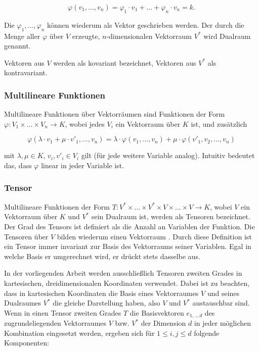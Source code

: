 \documentclass[a4paper,fontsize=12pt,toc=bib,parskip=half,ngerman]{scrartcl}
\begin{document}
\begin{equation}
	\varphi(v_1, ..., v_n) = \varphi_1 \cdot v_1 + ... + \varphi_n \cdot v_n = k.
\end{equation}

Die $\varphi_1, ..., \varphi_n$ k\"onnen wiederum als Vektor geschrieben werden. Der durch die Menge aller $\varphi$ \"uber $V$  erzeugte, $n$-dimensionalen Vektorraum $V^*$ wird Dualraum genannt\cite[S.~203]{bowen2008introduction}.

Vektoren aus $V$ werden als kovariant bezeichnet, Vektoren aus $V^*$ als kontravariant\cite[S.~205]{bowen2008introduction}.

\subsubsection{Multilineare Funktionen}
Multilineare Funktionen \"uber Vektorr\"aumen sind Funktionen der Form $\varphi: V_1 \times \dots \times V_n \rightarrow K$, wobei jedes $V_i$ ein Vektorraum \"uber $K$ ist, und zus\"atzlich 

\begin{equation}
	\varphi(\lambda \cdot v_1 + \mu \cdot v'_1, \dots, v_n) = \lambda \cdot \varphi(v_1, \dots, v_n) + \mu \cdot \varphi(v'_1, v_2, \dots, v_n)
\end{equation}

mit $\lambda, \mu \in K$, $v_i, v'_i \in V_i$ gilt (f\"ur jede weitere Variable analog). Intuitiv bedeutet das, dass $\varphi$ linear in jeder Variable ist\cite[S.~204, 218]{bowen2008introduction}.





\subsubsection{Tensor}
Multilineare Funktionen der Form $T: V^*\times\dots\times V^*\times V \times \dots \times V \rightarrow K$, wobei $V$ ein Vektorraum \"uber $K$ und $V^*$ sein Dualraum ist, werden als Tensoren bezeichnet\cite[S.~218]{bowen2008introduction}. Der Grad des Tensors ist definiert als die Anzahl an Variablen der Funktion. Die Tensoren \"uber $V$ bilden wiederum einen Vektorraum \cite[S.~220]{bowen2008introduction}. Durch diese Definition ist ein Tensor immer invariant zur Basis des Vektorraums seiner Variablen. Egal in welche Basis er umgerechnet wird, er dr\"uckt stets dasselbe aus.

In der vorliegenden Arbeit werden ausschlie{\ss}lich Tensoren zweiten Grades in kartesischen, dreidimensionalen Koordinaten verwendet. Dabei ist zu beachten, dass in kartesischen Koordinaten die Basis eines Vektorraumes $V$ und seines Dualraumes $V^*$ die gleiche Darstellung haben, also $V$ und $V^*$ austauschbar sind. Wenn in einen Tensor zweiten Grades $T$ die Basisvektoren $e_{1,..,d}$ des zugrundeliegenden Vektorraumes $V$ bzw. $V^*$ der Dimension $d$ in jeder m\"oglichen Kombination eingesetzt werden, ergeben sich f\"ur $1\leq i,j\leq d$ folgende Komponenten:
\end{document}
